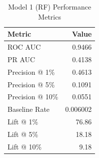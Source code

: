 \begin{table}[h]
\centering
\begin{tabular}{lr}
\toprule
Metric & Value \\
\midrule
ROC AUC & 0.9466 \\
PR AUC & 0.4138 \\
Precision @ 1\% & 0.4613 \\
Precision @ 5\% & 0.1091 \\
Precision @ 10\% & 0.0551 \\
Baseline Rate & 0.006002 \\
Lift @ 1\% & 76.86 \\
Lift @ 5\% & 18.18 \\
Lift @ 10\% & 9.18 \\
\bottomrule
\end{tabular}
\caption{Model 1 (RF) Performance Metrics}
\label{tab:model1_rf_metrics}
\end{table}

